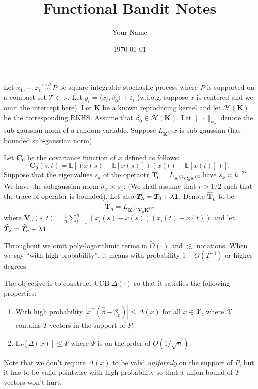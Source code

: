 \documentclass[11pt,a4paper]{article}
\title{Functional Bandit Notes}
\author{Your Name}
\date{\today}
\renewcommand{\hat}{\widehat}
\renewcommand{\tilde}{\widetilde}
\theoremstyle{definition}
\theoremstyle{plain}
\theoremstyle{remark}
\begin{document}
Let $x_1,\cdots,x_n\overset{i.i.d.}{\sim} P$ be square integrable stochastic process where $P$ is supported on a compact set $\mathcal T\subset \mathbb R.$ Let $y_i=\langle x_i,\beta_0 \rangle+\varepsilon_i$ (w.l.o.g. suppose $x$ is centered and we omit the intercept here). Let $\boldsymbol{K}$ be a known reproducing kernel and let $\mathcal H(\boldsymbol{K})$ be the corresponding RKHS. Assume that $\beta_0\in\mathcal H(\boldsymbol K).$ Let $\|\cdot\|_{\psi_2}$ denote the sub-gaussian norm of a random variable. Suppose $L_{\boldsymbol{K}^{1/2}}x$ is sub-gaussian (has bounded sub-gaussian norm).

Let $\boldsymbol{C}_0$ be the covariance function of $x$ defined as follows:
\[\boldsymbol{C}_0(s,t)=\mathbb{E}[(x(s)-\mathbb{E}[x(s)])(x(t)-\mathbb{E}[x(t)])].\]
 Suppose that the eigenvalues $s_k$ of the operaotr $\boldsymbol T_0=L_{\boldsymbol{K}^{1/2}\boldsymbol{C}_0\boldsymbol{K}^{1/2}}$ have $s_k\asymp k^{-2r}.$ We have the subgaussian norm $\sigma_x\asymp s_1.$ (We shall assume that $r>1/2$ such that the trace of operator is bounded).
Let also $\boldsymbol{T}_\lambda=\boldsymbol{T}_0+\lambda \bold{1}.$ Denote $\hat{\boldsymbol{T}}_n$ to be
\[\hat{\boldsymbol{T}}_n=L_{\boldsymbol{K}^{1/2}\boldsymbol{V}_n\boldsymbol{K}^{1/2}}\]
where \(\boldsymbol{V}_n(s,t)=\frac{1}{n}\sum_{i=1}^n (x_i(s)-\bar{x}(s))(x_i(t)-\bar{x}(t))\)
and let $\hat{\boldsymbol{T}}_\lambda=\hat{\boldsymbol{T}}_n+\lambda\bold{1}.$

Throughout we omit poly-logarithmic terms in $\tilde O(\cdot)$ and $\lesssim$ notations. When we say ``with high probability'', it means with probability $1-O(T^{-4})$ or higher degrees.



The objective is to construct UCB $\Delta(\cdot)$ so that it satisfies the following properties:
\begin{enumerate}
\item With high probability $|x^\top(\hat\beta-\beta_0)|\leq\Delta(x)$ for all $x\in\mathcal X$, where $\mathcal X$ contains $T$ vectors in the support of $P$;
\item $\mathbb E_P[\Delta(x)]\leq \Psi$ where $\Psi$ is on the order of $\tilde O(1/\sqrt{n})$.
\end{enumerate}

Note that we don't require $\Delta(x)$ to be valid \emph{uniformly} on the support of $P$, but it has to be valid pointwise with high probability so that a union bound of $T$ vectors won't hurt.
\end{document}
